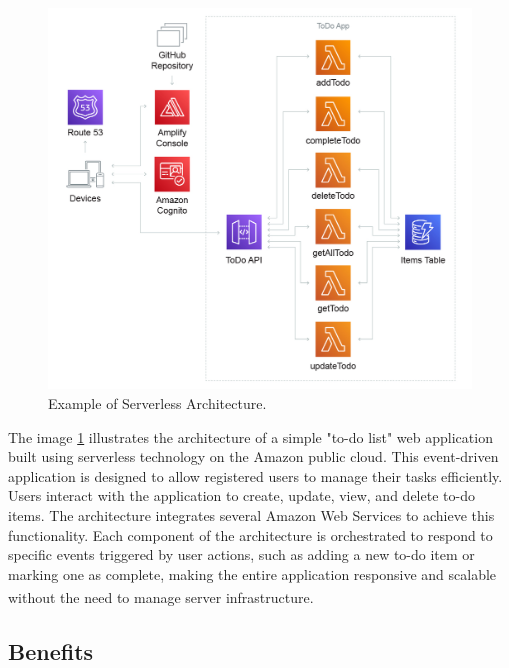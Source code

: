 \begin{figure}
    \centering
    \includegraphics[scale=0.5]{Pictures/3_serverless_example.jpg}
    \caption{Example of Serverless Architecture.}
    \label{fig:3_serverless_example}
\end{figure}

The image \ref{fig:3_serverless_example} illustrates the architecture of a simple "to-do list" web application built using
serverless technology on the Amazon public cloud. This event-driven application is designed to allow
registered users to manage their tasks efficiently. Users interact with the application to create,
update, view, and delete to-do items. The architecture integrates several Amazon Web Services to
achieve this functionality. Each component of the architecture is orchestrated to respond to
specific events triggered by user actions, such as adding a new to-do item or marking one as
complete, making the entire application responsive and scalable without the need to manage server
infrastructure\textsuperscript{\cite{serverless_1}}.

\subsection{Benefits}

